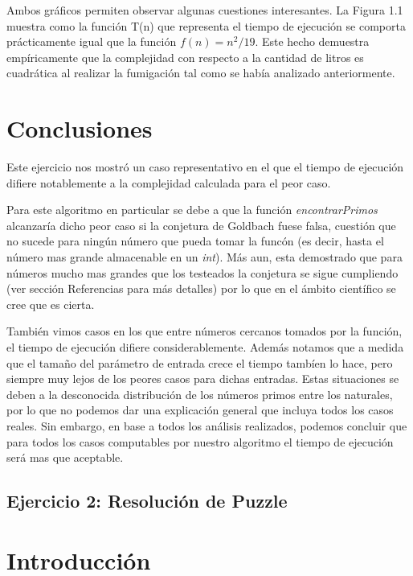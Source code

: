 \documentclass[a4paper,10pt] {article}
\begin{document}
Ambos gráficos permiten observar algunas cuestiones interesantes. La Figura 1.1 muestra como la función T(n) que representa el tiempo de ejecución se comporta prácticamente igual que la función $f(n) = n^2/19$. Este hecho demuestra empíricamente que la complejidad con respecto a la cantidad de litros es cuadrática al realizar la fumigación tal como se había analizado anteriormente.

\section*{Conclusiones}

Este ejercicio nos mostr\'o un caso representativo en el que el tiempo de ejecuci\'on difiere notablemente a la complejidad calculada para el peor caso.

Para este algoritmo en particular se debe a que la funci\'on \textit{encontrarPrimos} alcanzar\'ia dicho peor caso si la conjetura de Goldbach fuese falsa, cuesti\'on que no sucede para ning\'un n\'umero que pueda tomar la func\'on (es decir, hasta el n\'umero mas grande almacenable en un \textit{int}). M\'as aun, esta demostrado que para n\'umeros mucho mas grandes que los testeados la conjetura se sigue cumpliendo (ver secci\'on Referencias para m\'as detalles) por lo que en el \'ambito cient\'ifico se cree que es cierta.

Tambi\'en vimos casos en los que entre n\'umeros cercanos tomados por la funci\'on, el tiempo de ejecuci\'on difiere considerablemente. Adem\'as notamos que a medida que el tama\~{n}o del par\'ametro de entrada crece el tiempo tamb\'ien lo hace, pero siempre muy lejos de los peores casos para dichas entradas. Estas situaciones se deben a la desconocida distribuci\'on de los n\'umeros primos entre los naturales, por lo que no podemos dar una explicaci\'on general que incluya todos los casos reales. Sin embargo, en base a todos los an\'alisis realizados, podemos concluir que para todos los casos computables por nuestro algoritmo el tiempo de ejecuci\'on ser\'a mas que aceptable.

\bigskip

\begin{center}
\section*{Ejercicio 2: Resoluci\'on de Puzzle}
\end{center}

\bigskip
\section*{Introducci\'on}
\end{document}

